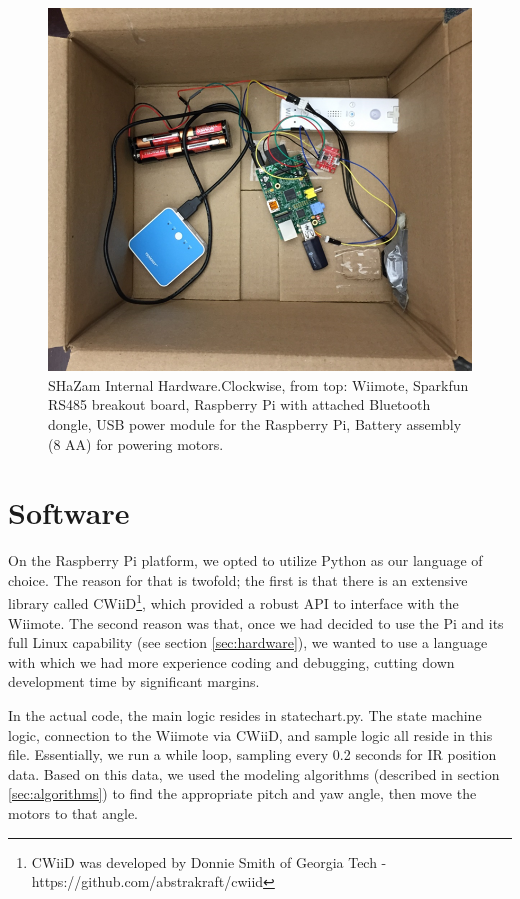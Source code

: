 \documentclass[conference, twocolumn]{IEEEtran}
\begin{document}
\begin{figure}[!t]
\begin{center}
\includegraphics[width=0.8\linewidth]{../images/shazam_inner}
\end{center}

\caption{SHaZam Internal Hardware.Clockwise, from top: Wiimote, Sparkfun RS485 breakout board, Raspberry Pi with attached Bluetooth dongle, USB power module for the Raspberry Pi, Battery assembly (8 AA) for powering motors.}
\label{fig:hw_inner}
\end{figure}

\section{Software}
On the Raspberry Pi platform, we opted to utilize Python as our language of choice. The reason for that is twofold; the first is that there is an extensive library called CWiiD\footnote{CWiiD was developed by Donnie Smith of Georgia Tech - https://github.com/abstrakraft/cwiid}, which provided a robust API to interface with the Wiimote. The second reason was that, once we had decided to use the Pi and its full Linux capability (see section \ref{sec:hardware}), we wanted to use a language with which we had more experience coding and debugging, cutting down development time by significant margins. 

In the actual code, the main logic resides in statechart.py. The state machine logic, connection to the Wiimote via CWiiD, and sample logic all reside in this file. Essentially, we run a while loop, sampling every 0.2 seconds for IR position data. Based on this data, we used the modeling algorithms (described in section \ref{sec:algorithms}) to find the appropriate pitch and yaw angle, then move the motors to that angle. 
\end{document}
